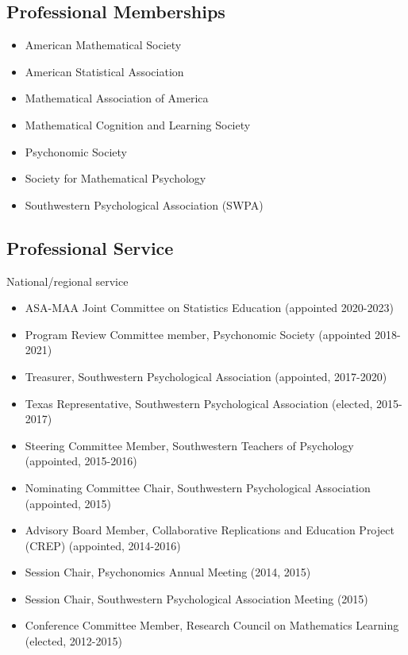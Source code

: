 \documentclass[article,10pt]{article}
\begin{document}
\subsection*{Professional Memberships}
\label{sec:org3fae594}
\begin{itemize}
\item American Mathematical Society
\item American Statistical Association
\item Mathematical Association of America
\item Mathematical Cognition and Learning Society
\item Psychonomic Society
\item Society for Mathematical Psychology
\item Southwestern Psychological Association (SWPA)
\end{itemize}

\subsection*{Professional Service}
\label{sec:org14bbdfd}

National/regional service 

\begin{itemize}
\item ASA-MAA Joint Committee on Statistics Education (appointed 2020-2023)
\item Program Review Committee member, Psychonomic Society (appointed 2018-2021)
\item Treasurer, Southwestern Psychological Association (appointed, 2017-2020)
\item Texas Representative, Southwestern Psychological Association (elected, 2015-2017)
\item Steering Committee Member, Southwestern Teachers of Psychology (appointed, 2015-2016)
\item Nominating Committee Chair, Southwestern Psychological Association (appointed, 2015)
\item Advisory Board Member, Collaborative Replications and Education Project (CREP) (appointed, 2014-2016)
\item Session Chair, Psychonomics Annual Meeting (2014, 2015)
\item Session Chair, Southwestern Psychological Association Meeting (2015)
\item Conference Committee Member, Research Council on Mathematics Learning (elected, 2012-2015)
\end{itemize}
\end{document}
